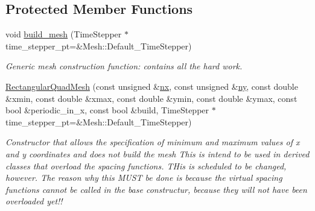 \subsection*{Protected Member Functions}
\begin{DoxyCompactItemize}
\item 
void \hyperlink{classoomph_1_1RectangularQuadMesh_afa579b413a2d8120e8228d840cb3582c}{build\+\_\+mesh} (Time\+Stepper $\ast$time\+\_\+stepper\+\_\+pt=\&Mesh\+::\+Default\+\_\+\+Time\+Stepper)
\begin{DoxyCompactList}\small\item\em Generic mesh construction function\+: contains all the hard work. \end{DoxyCompactList}\item 
\hyperlink{classoomph_1_1RectangularQuadMesh_aeda49fb3896e9e3aec328391b196a6bf}{Rectangular\+Quad\+Mesh} (const unsigned \&\hyperlink{classoomph_1_1RectangularQuadMesh_abfef93d6322886cdce14a437186e4821}{nx}, const unsigned \&\hyperlink{classoomph_1_1RectangularQuadMesh_a86d76a55eb7c4e8bca9b74d23c8b0412}{ny}, const double \&xmin, const double \&xmax, const double \&ymin, const double \&ymax, const bool \&periodic\+\_\+in\+\_\+x, const bool \&build, Time\+Stepper $\ast$time\+\_\+stepper\+\_\+pt=\&Mesh\+::\+Default\+\_\+\+Time\+Stepper)
\begin{DoxyCompactList}\small\item\em Constructor that allows the specification of minimum and maximum values of x and y coordinates and does not build the mesh This is intend to be used in derived classes that overload the spacing functions. T\+His is scheduled to be changed, however. The reason why this M\+U\+ST be done is because the virtual spacing functions cannot be called in the base constructur, because they will not have been overloaded yet!! \end{DoxyCompactList}\end{DoxyCompactItemize}
